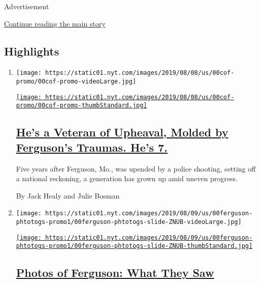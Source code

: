 Advertisement

\protect\hyperlink{after-subheader}{Continue reading the main story}

\hypertarget{highlights}{%
\subsection{Highlights}\label{highlights}}

\begin{enumerate}
\def\labelenumi{\arabic{enumi}.}
\item
  \texttt{[image: https://static01.nyt.com/images/2019/08/08/us/00cof-promo/00cof-promo-videoLarge.jpg]}

  \href{/2019/08/08/us/ferguson-riots-michael-brown.html}{\texttt{[image: https://static01.nyt.com/images/2019/08/08/us/00cof-promo/00cof-promo-thumbStandard.jpg]}}

  \hypertarget{hes-a-veteran-of-upheaval-molded-by-fergusons-traumas-hes-7}{%
  \subsection{\texorpdfstring{\href{/2019/08/08/us/ferguson-riots-michael-brown.html}{He's
  a Veteran of Upheaval, Molded by Ferguson's Traumas. He's
  7.}}{He's a Veteran of Upheaval, Molded by Ferguson's Traumas. He's 7.}}\label{hes-a-veteran-of-upheaval-molded-by-fergusons-traumas-hes-7}}

  Five years after Ferguson, Mo., was upended by a police shooting,
  setting off a national reckoning, a generation has grown up amid
  uneven progress.

  By Jack Healy and Julie Bosman
\item
  \texttt{[image: https://static01.nyt.com/images/2019/08/09/us/00ferguson-phtotogs-promo1/00ferguson-phtotogs-slide-ZNUB-videoLarge.jpg]}

  \href{/2019/08/09/us/ferguson-michael-brown-photos.html}{\texttt{[image: https://static01.nyt.com/images/2019/08/09/us/00ferguson-phtotogs-promo1/00ferguson-phtotogs-slide-ZNUB-thumbStandard.jpg]}}

  \hypertarget{photos-of-ferguson-what-they-saw}{%
  \subsection{\texorpdfstring{\href{/2019/08/09/us/ferguson-michael-brown-photos.html}{Photos
  of Ferguson: What They
  Saw}}{Photos of Ferguson: What They Saw}}\label{photos-of-ferguson-what-they-saw}}


\end{enumerate}
